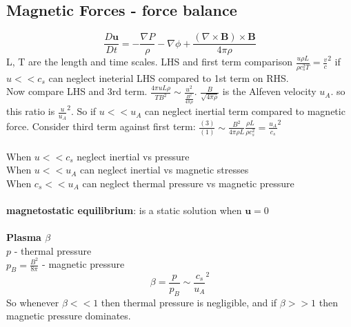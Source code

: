 \documentclass{article}
\begin{document}
\subsection{Magnetic Forces - force balance}
$$
\frac{D \bm u}{Dt} = - \frac{\nabla P}{\rho} - \nabla \phi + \frac{(\nabla \times \bm B) \times \bm B}{4 \pi \rho}
$$
L, T are the length and time scales. LHS and first term comparison $\frac{u \rho L}{\rho c_s^2 T} = \frac{v}{c}^2$ if $u<<c_s$ can neglect ineterial LHS compared to 1st term on RHS.\\
Now compare LHS and 3rd term. $\frac{4\pi uL\rho}{TB^2} \sim \frac{u^2}{\frac{B^2}{4\pi \rho}}$. $ \frac{B}{\sqrt{4\pi \rho}}$ is the Alfeven velocity $u_A$. so this ratio is $\frac{u}{u_A}^2$. So if $u << u_A$ can neglect inertial term compared to magnetic force. Consider third term against first term: $\frac{(3)}{(1)} \sim \frac{B^2}{4\pi \rho L}\frac{\rho L}{\rho c_s^2} = \frac{u_A}{c_s}^2$
\\\\
\noindent
When $u << c_s$ neglect inertial vs pressure\\
When $u << u_A$ can neglect inertial vs magnetic stresses\\
When $c_s << u_A$ can neglect thermal pressure vs magnetic pressure\\\\
\textbf{magnetostatic equilibrium}: is a static solution when $\bm u = 0$\\ \\
\textbf{Plasma $\beta$ }\\
$p$ - thermal pressure\\
$p_B = \frac{B^2}{8\pi}$ - magnetic pressure\\
$$
\beta = \frac{p}{p_B} \sim \frac{c_s}{u_A}^2
$$
So whenever $\beta <<1$ then thermal pressure is negligible, and if $\beta >>1$ then magnetic pressure dominates.\\
\end{document}
